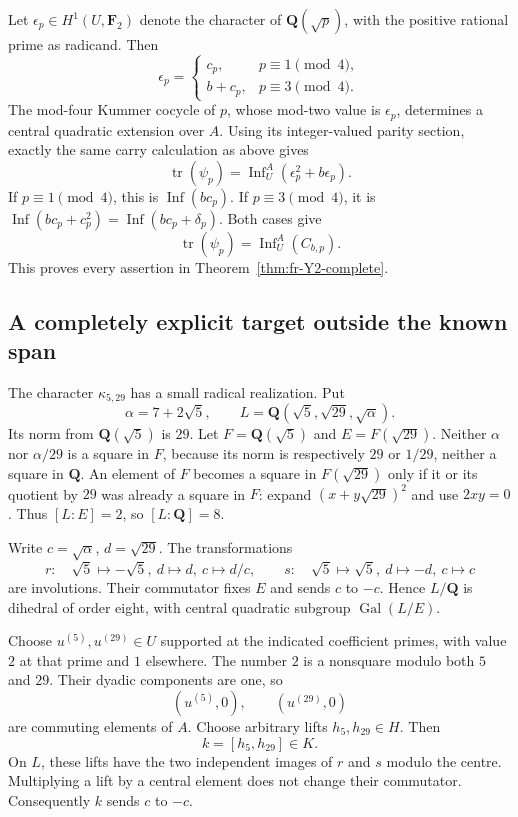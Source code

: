 Let \(\epsilon_p\in H^1(U,\mathbf F_2)\) denote the character
of \(\mathbf Q(\sqrt p)\), with the positive rational prime
as radicand. Then
\[
 \epsilon_p=
 \begin{cases}
 c_p,&p\equiv1\pmod4,\\
 b+c_p,&p\equiv3\pmod4.
 \end{cases}
\]
The mod-four Kummer cocycle of \(p\), whose mod-two value is
\(\epsilon_p\), determines a central quadratic extension over \(A\).
Using its integer-valued parity section, exactly the same carry
calculation as above gives
\[
 \operatorname{tr}(\psi_p)
 =\operatorname{Inf}_U^A(\epsilon_p^2+b\epsilon_p).
\]
If \(p\equiv1\pmod4\), this is \(\operatorname{Inf}(bc_p)\).
If \(p\equiv3\pmod4\), it is
\(\operatorname{Inf}(bc_p+c_p^2)
 =\operatorname{Inf}(bc_p+\delta_p)\).
Both cases give
\[
                  \operatorname{tr}(\psi_p)
                         =\operatorname{Inf}_U^A(C_{b,p}).
\]
This proves every assertion in
Theorem~\ref{thm:fr-Y2-complete}.

\subsection{A completely explicit target outside the known span}

The character \(\kappa_{5,29}\) has a small radical realization.
Put
\[
 \alpha=7+2\sqrt5,\qquad
 L=\mathbf Q(\sqrt5,\sqrt{29},\sqrt\alpha).
\]
Its norm from \(\mathbf Q(\sqrt5)\) is \(29\).
Let \(F=\mathbf Q(\sqrt5)\) and \(E=F(\sqrt{29})\).
Neither \(\alpha\) nor \(\alpha/29\) is a square in \(F\),
because its norm is respectively \(29\) or \(1/29\),
neither a square in \(\mathbf Q\).
An element of \(F\) becomes a square in \(F(\sqrt{29})\)
only if it or its quotient by \(29\) was already a square in \(F\):
expand \((x+y\sqrt{29})^2\) and use \(2xy=0\).
Thus \([L:E]=2\), so \([L:\mathbf Q]=8\).

Write \(c=\sqrt\alpha\), \(d=\sqrt{29}\).
The transformations
\[
 r:\quad \sqrt5\mapsto-\sqrt5,\ d\mapsto d,\ c\mapsto d/c,
 \qquad
 s:\quad \sqrt5\mapsto\sqrt5,\ d\mapsto-d,\ c\mapsto c
\]
are involutions. Their commutator fixes \(E\) and sends
\(c\) to \(-c\). Hence \(L/\mathbf Q\) is dihedral of order
eight, with central quadratic subgroup \(\operatorname{Gal}(L/E)\).

Choose \(u^{(5)},u^{(29)}\in U\) supported at the indicated
coefficient primes, with value \(2\) at that prime and \(1\)
elsewhere. The number \(2\) is a nonsquare modulo both
\(5\) and \(29\). Their dyadic components are one, so
\[
 (u^{(5)},0),\qquad (u^{(29)},0)
\]
are commuting elements of \(A\).
Choose arbitrary lifts \(h_5,h_{29}\in H\).
Then
\[
                         k=[h_5,h_{29}]\in K.
\]
On \(L\), these lifts have the two independent images of
\(r\) and \(s\) modulo the centre. Multiplying a lift by a
central element does not change their commutator.
Consequently \(k\) sends \(c\) to \(-c\).

